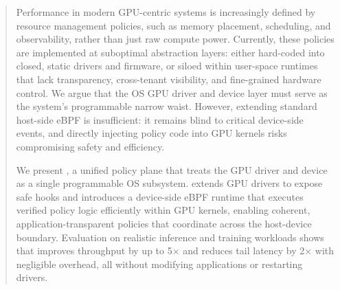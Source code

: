 \begin{abstract}
Performance in modern GPU-centric systems is increasingly defined by resource management policies, such as memory placement, scheduling, and observability, rather than just raw compute power. Currently, these policies are implemented at suboptimal abstraction layers: either hard-coded into closed, static drivers and firmware, or siloed within user-space runtimes that lack transparency, cross-tenant visibility, and fine-grained hardware control. We argue that the OS GPU driver and device layer must serve as the system's programmable narrow waist. However, extending standard host-side eBPF is insufficient: it remains blind to critical device-side events, and directly injecting policy code into GPU kernels risks compromising safety and efficiency.

We present \sys, a unified policy plane that treats the GPU driver and device as a single programmable OS subsystem. \sys extends GPU drivers to expose safe hooks and introduces a device-side eBPF runtime that executes verified policy logic efficiently within GPU kernels, enabling coherent, application-transparent policies that coordinate across the host-device boundary. Evaluation on realistic inference and training workloads shows that \sys improves throughput by up to  5× and reduces tail latency by 2× with negligible overhead, all without modifying applications or restarting drivers.



\end{abstract}

